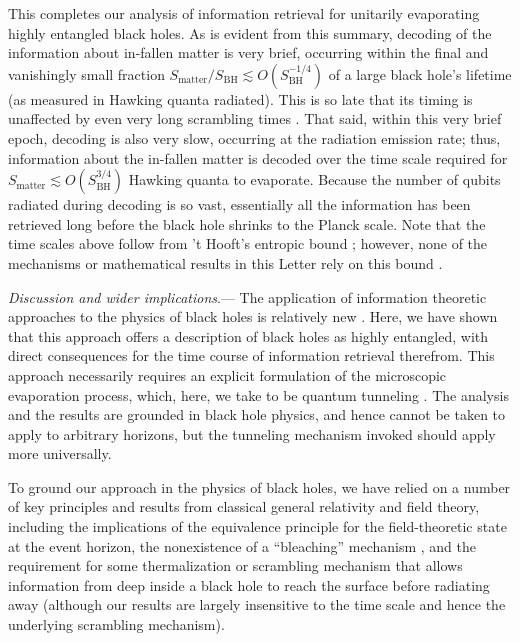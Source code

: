 \documentclass[twocolumn,aps,showpacs,prl]{revtex4}
\begin{document}
This completes our analysis of information retrieval for unitarily
evaporating highly entangled black holes.
As is evident from this
summary, decoding of the information about in-fallen matter is
very brief, occurring within the final and vanishingly small fraction
$S_{\text{matter}}/S_{\text{BH}}\lesssim O(S_{\text{BH}}^{-1/4})$
of a large black hole's lifetime (as measured in Hawking quanta
radiated). This is so late that its timing is unaffected by even
very long scrambling times \cite{Giddings07}. That said, within this
very brief epoch, decoding is also very slow, occurring at the
radiation emission rate; thus, information about the in-fallen
matter is decoded over the time scale required for
$S_{\text{matter}} \lesssim O(S_{\text{BH}}^{3/4})$ Hawking quanta
to evaporate. Because the number of qubits radiated during decoding
is so vast, essentially all the information has been retrieved long
before the black hole shrinks to the Planck scale.
Note that the time scales above follow from 't Hooft's
entropic bound \cite{tHooft93}; however, none of the mechanisms or
mathematical results in this Letter rely on this bound \cite{SM}.

{\it Discussion and wider implications}.---%
The application of information theoretic approaches to the physics of
black holes is relatively
new \cite{me,Nikolic,Page93,Hayden07,Smolin,B10,Susskind93}.
Here, we have shown that this approach offers a
description of black holes as highly entangled, with direct consequences
for the time course of information retrieval therefrom. 
This approach necessarily requires an explicit formulation of the 
microscopic evaporation process, which, here, we take to be quantum 
tunneling \cite{B10}. The analysis and the results are grounded
in black hole physics, and hence cannot be taken to apply to arbitrary
horizons, but the tunneling mechanism invoked should apply more universally. 

To ground our approach in the physics of black holes, we have relied
on a number of key principles and results from classical general
relativity and field theory, including the implications of the
equivalence principle \cite{Susskind93} for the field-theoretic state
at the event horizon, the nonexistence of a ``bleaching''
mechanism \cite{bleach}, and the requirement for some thermalization
or scrambling mechanism \cite{Hayden07,Sekino08,Giddings07} that
allows information from deep inside a black hole to reach the surface
before radiating away \cite{fnB} (although our results are largely
insensitive to the time scale and hence the underlying scrambling
mechanism).
\end{document}
